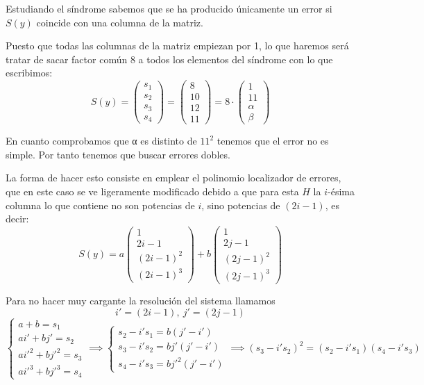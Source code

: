 \begin{problem}[13]
Estudiando el síndrome sabemos que se ha producido únicamente un error si $S(y)$ coincide con una columna de la matriz.

Puesto que todas las columnas de la matriz empiezan por 1, lo que haremos será tratar de sacar factor común 8 a todos los elementos del síndrome con lo que escribimos:
\[S(y) = \left( \begin{array}{c}s_1 \\ s_2 \\ s_3 \\ s_4 \end{array}\right) = \left( \begin{array}{c}8 \\ 10 \\ 12 \\ 11 \end{array}\right) = 8\cdot \left( \begin{array}{c}1 \\ 11 \\ α \\ β \end{array}\right)\]

En cuanto comprobamos que α es distinto de $11^2$ tenemos que el error no es simple. Por tanto tenemos que buscar errores dobles.

La forma de hacer esto consiste en emplear el polinomio localizador de errores, que en este caso se ve ligeramente modificado debido a que para esta $H$ la $i$-ésima columna lo que contiene no son potencias de $i$, sino potencias de $(2i - 1)$, es decir:
\begin{equation}
\label{eq:ejrc13b-hoja4}
	S(y)=
	a\left( \begin{array}{c}1 \\ 2i-1 \\ (2i-1)^2 \\ (2i-1)^3 \end{array}\right) +
	b\left( \begin{array}{c}1 \\ 2j-1 \\ (2j-1)^2 \\ (2j-1)^3 \end{array}\right)
\end{equation}

Para no hacer muy cargante la resolución del sistema llamamos
\[i'=(2i-1),\ j'=(2j-1)\]
\[\left\{ \begin{array}{l}
a+b=s_1\\
ai'+bj'=s_2\\
ai'^2+bj'^2=s_3\\
ai'^3+bj'^3=s_4
\end{array}\right. \implies \left\{ \begin{array}{l}
s_2 - i's_1 = b(j' - i')\\
s_3 - i's_2 = bj'(j' - i')\\
s_4 - i's_3 = bj'^2(j' - i')
\end{array}\right. \implies (s_3 - i's_2)^2 = (s_2 - i's_1)(s_4 - i's_3)\]


\end{problem}
